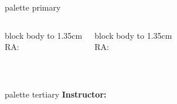
\begin{frame}[plain]
  \vfill
  \centering

  \begin{beamercolorbox}[sep=10pt,center,rounded=true]{palette primary}
    {\fontsize{13}{17}\selectfont \textsc{\MyTitle}} \\
    \vspace{0.2cm}
    {\small \MySubtitle}
  \end{beamercolorbox}

  \vspace{0.65cm}

  \begin{columns}[onlytextwidth, T]
    \begin{beamercolorbox}[wd=\linewidth,ht=1.35cm,dp=0cm,center,rounded=true]{block body}
      \vbox to 1.35cm{
        \vfil
        {\fontsize{9.5}{11.5}\selectfont \StudentAName} \\
        {\fontsize{8}{10}\selectfont RA: \StudentARA}
        \vfil
      }
    \end{beamercolorbox}

    \hfill

    \begin{beamercolorbox}[wd=\linewidth,ht=1.35cm,dp=0cm,center,rounded=true]{block body}
      \vbox to 1.35cm{
        \vfil
        {\fontsize{9.5}{11.5}\selectfont \StudentBName} \\
        {\fontsize{8}{10}\selectfont RA: \StudentBRA}
        \vfil
      }
    \end{beamercolorbox}
  \end{columns}

  \vspace{0.55cm}

  \textit{\small \MyInstitute} \\
  \vspace{0.1cm}
  {\small \textbf{\MyCourse}}

  \vfill

  \begin{beamercolorbox}[sep=5pt,center,rounded=true]{palette tertiary}
    \footnotesize \textbf{Instructor:} \MyInstructor
  \end{beamercolorbox}

  \vspace{0.2cm}
  \scriptsize \MyDate
\end{frame}
